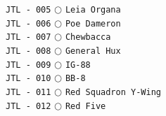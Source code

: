\documentclass[a4paper,landscape]{article}
\begin{document}
\begin{multicols*}{5}
\texttt{JTL - 005} \(\bigcirc\)  \texttt{Leia Organa} \vspace{-0.3mm}\\ 
\texttt{JTL - 006} \(\bigcirc\)  \texttt{Poe Dameron} \vspace{-0.3mm}\\ 
\texttt{JTL - 007} \(\bigcirc\)  \texttt{Chewbacca} \vspace{-0.3mm}\\ 
\texttt{JTL - 008} \(\bigcirc\)  \texttt{General Hux} \vspace{-0.3mm}\\ 
\texttt{JTL - 009} \(\bigcirc\)  \texttt{IG-88} \vspace{-0.3mm}\\ 
\texttt{JTL - 010} \(\bigcirc\)  \texttt{BB-8} \vspace{-0.3mm}\\ 
\texttt{JTL - 011} \(\bigcirc\)  \texttt{Red Squadron Y-Wing} \vspace{-0.3mm}\\ 
\texttt{JTL - 012} \(\bigcirc\)  \texttt{Red Five} \vspace{-0.3mm}\\ 

\end{multicols*}
\end{document}
